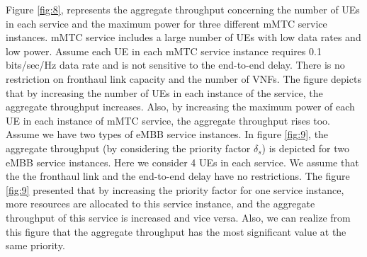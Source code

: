 \documentclass[lettersize,journal]{IEEEtran}
\begin{document}
Figure \ref{fig:8}, represents the aggregate throughput concerning the number of UEs in each service and the maximum power for three different mMTC service instances. mMTC service includes a large number of UEs with low data rates and low power. 
Assume each UE in each mMTC service instance requires 0.1 bits/sec/Hz data rate and is not sensitive to the end-to-end delay. There is no restriction on fronthaul link capacity and the number of VNFs.
The figure depicts that by increasing the number of UEs in each instance of the service, the aggregate throughput increases. 
Also, by increasing the maximum power of each UE in each instance of mMTC service, the aggregate throughput rises too.
Assume we have two types of eMBB service instances. In figure \ref{fig:9}, the aggregate throughput (by considering the priority factor $\delta_s$) is depicted for two eMBB service instances. Here we consider 4 UEs in each service. We assume that the the fronthaul link and the end-to-end delay have no restrictions.
The figure \ref{fig:9} presented that by increasing the priority factor for one service instance, more resources are allocated to this service instance, and the aggregate throughput of this service is increased and vice versa. Also, we can realize from this figure that the aggregate throughput has the most significant value at the same priority.
\end{document}

